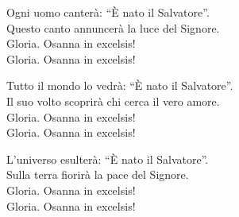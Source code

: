  
\strofa Ogni uomo canterà: ``È nato il Salvatore''.\\
Questo canto annuncerà la luce del Signore.\\
Gloria. Osanna in excelsis!\\
Gloria. Osanna in excelsis!

\spazio

\strofa Tutto il mondo lo vedrà: ``È nato il Salvatore''.\\
Il suo volto scoprirà chi cerca il vero amore.\\
Gloria. Osanna in excelsis!\\
Gloria. Osanna in excelsis!

\spazio

\strofa L'universo esulterà: ``È nato il Salvatore''.\\
Sulla terra fiorirà la pace del Signore.\\
Gloria. Osanna in excelsis!\\
Gloria. Osanna in excelsis!